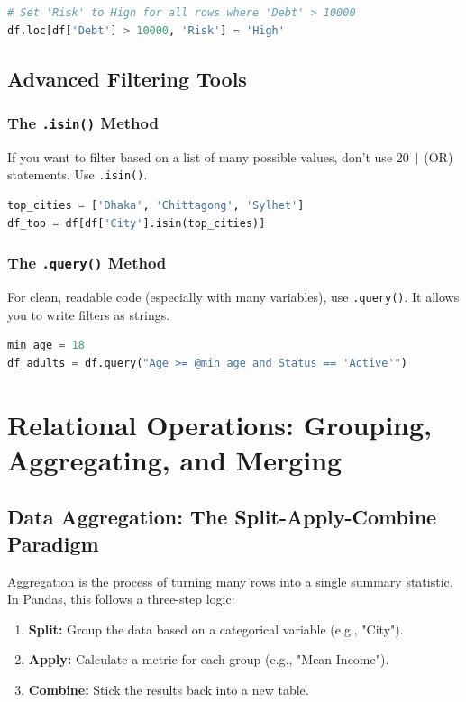 \documentclass{article}
\begin{document}
\begin{lstlisting}[language=Python]
# Set 'Risk' to High for all rows where 'Debt' > 10000
df.loc[df['Debt'] > 10000, 'Risk'] = 'High'
\end{lstlisting}

\subsection{Advanced Filtering Tools}

\subsubsection{The \texttt{.isin()} Method}
If you want to filter based on a list of many possible values, don't use 20 \texttt{|} (OR) statements. Use \texttt{.isin()}.
\begin{lstlisting}[language=Python]
top_cities = ['Dhaka', 'Chittagong', 'Sylhet']
df_top = df[df['City'].isin(top_cities)]
\end{lstlisting}

\subsubsection{The \texttt{.query()} Method}
For clean, readable code (especially with many variables), use \texttt{.query()}. It allows you to write filters as strings.
\begin{lstlisting}[language=Python]
min_age = 18
df_adults = df.query("Age >= @min_age and Status == 'Active'")
\end{lstlisting}

\newpage

\section{Relational Operations: Grouping, Aggregating, and Merging}

\subsection{Data Aggregation: The Split-Apply-Combine Paradigm}
Aggregation is the process of turning many rows into a single summary statistic. In Pandas, this follows a three-step logic:
\begin{enumerate}
    \item \textbf{Split:} Group the data based on a categorical variable (e.g., "City").
    \item \textbf{Apply:} Calculate a metric for each group (e.g., "Mean Income").
    \item \textbf{Combine:} Stick the results back into a new table.
\end{enumerate}
\end{document}
